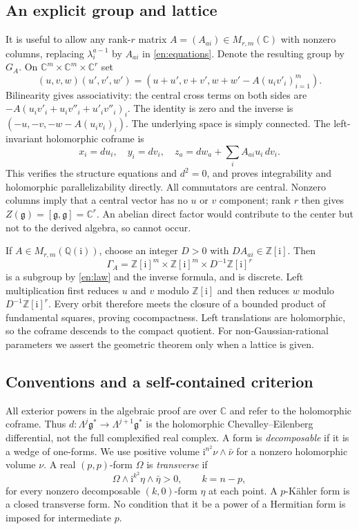 \documentclass[12pt]{amsart}
\theoremstyle{definition}
\theoremstyle{remark}
\numberwithin{equation}{section}
\newcommand{\Z}{\mathbb{Z}}
\newcommand{\C}{\mathbb{C}}
\newcommand{\Q}{\mathbb{Q}}
\newcommand{\gfr}{\mathfrak g}
\newcommand{\ii}{\mathrm i}
\begin{document}
\subsection{An explicit group and lattice}
It is useful to allow any rank-$r$ matrix $A=(A_{ai})\in M_{r,m}(\C)$
with nonzero columns, replacing $\lambda_i^{a-1}$ by $A_{ai}$ in
\eqref{en:equations}. Denote the resulting group by $G_A$.
On $\C^m\times\C^m\times\C^r$ set
\begin{equation}\label{en:law}
 (u,v,w)(u',v',w')=
 \left(u+u',v+v',w+w'-A(u_i v'_i)_{i=1}^m\right).
\end{equation}
Bilinearity gives associativity: the central cross terms on both sides
are $-A(u_i v'_i+u_i v''_i+u'_i v''_i)_i$. The identity is zero and the
inverse is $(-u,-v,-w-A(u_i v_i)_i)$. The underlying space is simply
connected. The left-invariant holomorphic coframe is
\[
 x_i=du_i,\quad y_i=dv_i,\quad
 z_a=dw_a+\sum_i A_{ai}u_i\,dv_i.
\]
This verifies the structure equations and $d^2=0$, and proves
integrability and holomorphic parallelizability directly.
All commutators are central. Nonzero columns imply that a central vector
has no $u$ or $v$ component; rank $r$ then gives
$Z(\gfr)=[\gfr,\gfr]=\C^r$. An abelian direct factor would contribute to
the center but not to the derived algebra, so cannot occur.

If $A\in M_{r,m}(\Q(\ii))$, choose an integer $D>0$ with
$DA_{ai}\in\Z[\ii]$. Then
\begin{equation}\label{en:lattice}
 \Gamma_A=\Z[\ii]^m\times\Z[\ii]^m\times D^{-1}\Z[\ii]^r
\end{equation}
is a subgroup by \eqref{en:law} and the inverse formula, and is discrete.
Left multiplication first reduces $u$ and $v$ modulo $\Z[\ii]$ and then
reduces $w$ modulo $D^{-1}\Z[\ii]^r$. Every orbit therefore meets the
closure of a bounded product of fundamental squares, proving
cocompactness. Left translations are holomorphic, so the coframe descends
to the compact quotient. For non-Gaussian-rational parameters we assert
the geometric theorem only when a lattice is given.

\subsection{Conventions and a self-contained criterion}
All exterior powers in the algebraic proof are over $\C$ and refer to
the holomorphic coframe. Thus $d:\Lambda^j\gfr^*\to\Lambda^{j+1}\gfr^*$
is the holomorphic Chevalley--Eilenberg differential, not the full
complexified real complex. A form is \emph{decomposable} if it is a wedge
of one-forms. We use positive volume $\ii^{n^2}\nu\wedge\bar\nu$ for a
nonzero holomorphic volume $\nu$. A real $(p,p)$-form $\Omega$ is
\emph{transverse} if
\[
 \Omega\wedge\ii^{k^2}\eta\wedge\bar\eta>0,
 \qquad k=n-p,
\]
for every nonzero decomposable $(k,0)$-form $\eta$ at each point.
A $p$-K\"ahler form is a closed transverse form. No condition that it be
a power of a Hermitian form is imposed for intermediate $p$.
\end{document}
